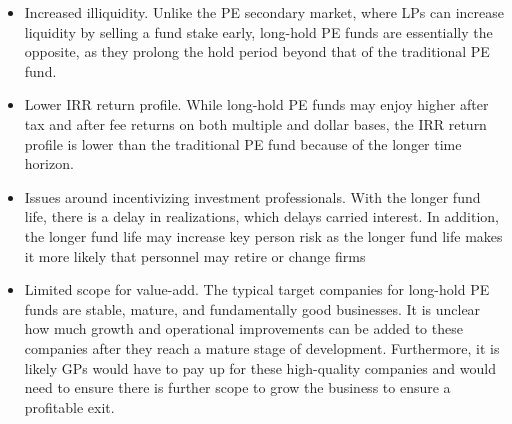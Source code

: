 \documentclass[11pt]{article}
\begin{document}
\begin{itemize}
  \item Increased illiquidity. Unlike the PE secondary market, where LPs can increase liquidity by selling a fund stake early, long-hold PE funds are essentially the opposite, as they prolong the hold period beyond that of the traditional PE fund.
  \item Lower IRR return profile. While long-hold PE funds may enjoy higher after tax and after fee returns on both multiple and dollar bases, the IRR return profile is lower than the traditional PE fund because of the longer time horizon.
  \item Issues around incentivizing investment professionals. With the longer fund life, there is a delay in realizations, which delays carried interest. In addition, the longer fund life may increase key person risk as the longer fund life makes it more likely that personnel may retire or change firms
  \item Limited scope for value-add. The typical target companies for long-hold PE funds are stable, mature, and fundamentally good businesses. It is unclear how much growth and operational improvements can be added to these companies after they reach a mature stage of development. Furthermore, it is likely GPs would have to pay up for these high-quality companies and would need to ensure there is further scope to grow the business to ensure a profitable exit.
\end{itemize}
\end{document}
